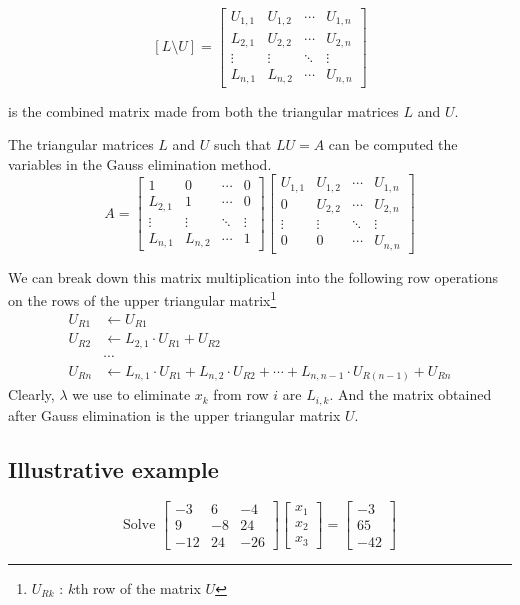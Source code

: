	\[ [L\text{\textbackslash{}}U] = \begin{bmatrix} U_{1,1} & U_{1,2} & \cdots & U_{1,n} \\ L_{2,1} & U_{2,2} & \cdots & U_{2,n} \\ \vdots & \vdots & \ddots & \vdots \\  L_{n,1} & L_{n,2} & \cdots & U_{n,n} \end{bmatrix} \]

	is the combined matrix made from both the triangular matrices $L$ and $U$.

	The triangular matrices $L$ and $U$ such that $LU = A$ can be computed the variables in the Gauss elimination method.
	\[ A = \begin{bmatrix} 1 & 0 & \cdots & 0 \\ L_{2,1} & 1 & \cdots & 0 \\ \vdots & \vdots & \ddots & \vdots \\ L_{n,1} & L_{n,2} & \cdots & 1 \end{bmatrix} \begin{bmatrix} U_{1,1} & U_{1,2} & \cdots & U_{1,n} \\ 0 & U_{2,2} & \cdots & U_{2,n} \\ \vdots & \vdots & \ddots & \vdots \\ 0 & 0 & \cdots & U_{n,n} \end{bmatrix} \]
	\begin{commentary}
		We can break down this matrix multiplication into the following row operations on the rows of the upper triangular matrix\footnote{$U_{Rk}$ : $k$th row of the matrix $U$}
	\begin{align*}
		U_{R1} & \leftarrow U_{R1} \\
		U_{R2} & \leftarrow L_{2,1}\cdot{}U_{R1} + U_{R2} \\
		& \cdots \\
		U_{Rn} & \leftarrow L_{n,1}\cdot{}U_{R1} + L_{n,2}\cdot{}U_{R2} + \cdots + L_{n,n-1}\cdot{}U_{R(n-1)} + U_{Rn}
	\end{align*}
	Clearly, $\lambda$ we use to eliminate $x_k$ from row $i$ are $L_{i,k}$. And the matrix obtained after Gauss elimination is the upper triangular matrix $U$.
	\end{commentary}
\subsection{Illustrative example}
	\[ \text{Solve } \begin{bmatrix} -3 & 6 & -4 \\ 9 & -8 & 24 \\ -12 & 24 & -26 \end{bmatrix} \begin{bmatrix} x_1 \\ x_2 \\ x_3 \end{bmatrix} = \begin{bmatrix} -3 \\ 65 \\ -42 \end{bmatrix} \]
